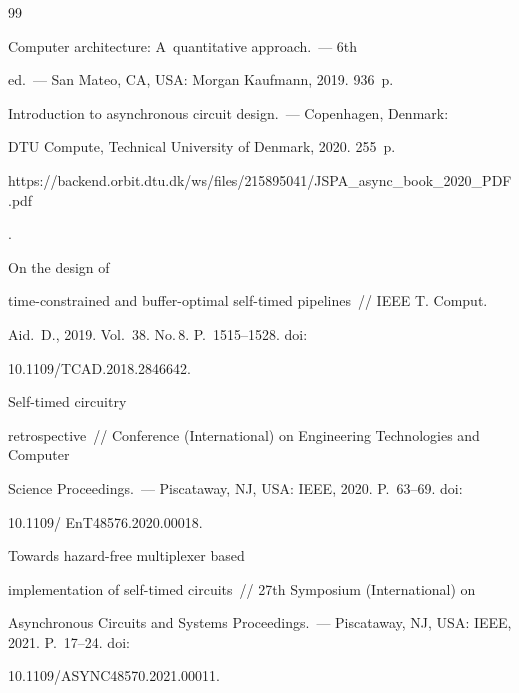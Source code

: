 {\small\frenchspacing

{%


\begin{thebibliography}{99}


 Computer architecture: A~quantitative approach.~--- 6th 

ed.~--- San Mateo, CA, USA: Morgan Kaufmann, 2019. 936~p. 


 Introduction to asynchronous circuit design.~--- Copenhagen, Denmark: 

DTU Compute, Technical University of Denmark, 2020. 255~p. {\sf 

https://backend.\linebreak orbit.dtu.dk/ws/files/215895041/JSPA\_async\_book\_2020\_PDF.pdf}.




 On the design of  

time-constrained and buffer-optimal self-timed pipelines~/\!\!/ IEEE T. Comput.

Aid.~D., 2019. Vol.~38. No.\,8. P.~1515--1528. doi: 

10.1109\!/\!TCAD.2018.2846642.


 Self-timed circuitry 

retrospective~/\!\!/ Conference (International) on Engineering Technologies and Computer 

Science Proceedings.~--- Piscataway, NJ, USA: IEEE, 2020. P.~63--69. doi: 

10.1109\!/ EnT48576.2020.00018.


 Towards hazard-free multiplexer based 

implementation of self-timed circuits~/\!\!/ 27th Symposium (International) on 

Asynchronous Circuits and Systems Proceedings.~--- Piscataway, NJ, USA: IEEE, 2021. P.~17--24. doi: 

10.1109\!/\!ASYNC48570.2021.00011.






\end{thebibliography}}}
